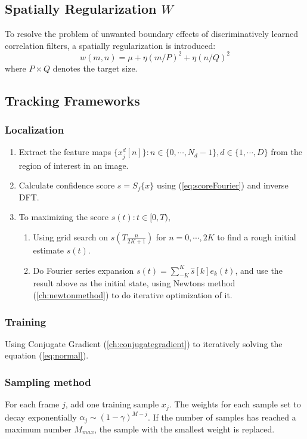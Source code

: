 \documentclass[12pt]{article}
\numberwithin{equation}{section}
\begin{document}
\subsection{Spatially Regularization $W$ \cite{danelljan2015learning}}
To resolve the problem of unwanted boundary effects of discriminatively learned correlation filters, a spatially regularization is introduced:
\begin{equation}
	w(m, n) = \mu + \eta(m/P)^2 + \eta(n/Q)^2
\end{equation}
where $P \times Q$ denotes the target size. \par
\subsection{Tracking Frameworks}
\subsubsection{Localization}
\begin{enumerate}
	\item Extract the feature maps $\{x^d_j[n]\}: n \in \{0, \cdots, N_d -1\}, d \in \{1, \cdots, D\}$ from the region of interest in an image.
	\item Calculate confidence score $s=S_f\{x\}$ using (\ref{eq:scoreFourier}) and inverse DFT. 
	\item To maximizing the score $s(t): t\in [0,T)$,
		\begin{enumerate}
			\item Using grid search on $s(T\frac{n}{2K+1})$ for $n=0, \cdots, 2K$ to find a rough
			 initial estimate $s(t)$.
			\item Do Fourier series expansion $s(t)=\sum^K_{-K}\hat{s}[k]e_k(t)$, and use the result above
			as the initial state, using Newtons method (\ref{ch:newtonmethod}) to do iterative optimization of it.
		\end{enumerate}
\end{enumerate}
\subsubsection{Training}
Using Conjugate Gradient (\ref{ch:conjugategradient}) to iteratively solving the equation (\ref{eq:normal}).
\subsubsection{Sampling method} \label{ch:samplingccot}
For each frame $j$, add one training sample $x_j$. The weights for each sample set to decay exponentially $\alpha_j \sim (1-\gamma)^{M-j}$. If the number of samples has reached a maximum number $M_{max}$, the sample with the smallest weight is replaced.
\end{document}
